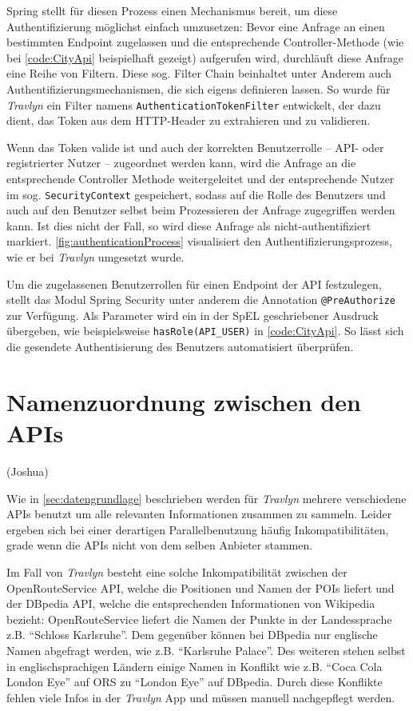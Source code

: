 		Spring stellt für diesen Prozess einen Mechanismus bereit, um diese Authentifizierung möglichst einfach umzusetzen: Bevor eine Anfrage an einen bestimmten Endpoint zugelassen und die entsprechende Controller-Methode (wie bei \autoref{code:CityApi} beispielhaft gezeigt) aufgerufen wird, durchläuft diese Anfrage eine Reihe von Filtern. Diese sog. Filter Chain beinhaltet unter Anderem auch Authentifizierungsmechanismen, die sich eigens definieren lassen. So wurde für \textit{Travlyn} ein Filter namens \lstinline|AuthenticationTokenFilter| entwickelt, der dazu dient, das Token aus dem \acs{HTTP}-Header zu extrahieren und zu validieren. 
		
		Wenn das Token valide ist und auch der korrekten Benutzerrolle -- \acs{API}- oder registrierter Nutzer -- zugeordnet werden kann, wird die Anfrage an die entsprechende Controller Methode weitergeleitet und der entsprechende Nutzer im sog. \lstinline|SecurityContext| gespeichert, sodass auf die Rolle des Benutzers und auch auf den Benutzer selbst beim Prozessieren der Anfrage zugegriffen werden kann. Ist dies nicht der Fall, so wird diese Anfrage als nicht-authentifiziert markiert. \autoref{fig:authenticationProcess} visualisiert den Authentifizierungsprozess, wie er bei \textit{Travlyn} umgesetzt wurde.
		
		Um die zugelassenen Benutzerrollen für einen Endpoint der \acs{API} festzulegen, stellt das Modul Spring Security unter anderem die Annotation \lstinline|@PreAuthorize| zur Verfügung. Als Parameter wird ein in der \ac{SpEL} geschriebener Ausdruck übergeben, wie beispielsweise \lstinline|hasRole(API_USER)| in \autoref{code:CityApi}. So lässt sich die gesendete Authentisierung des Benutzers automatisiert überprüfen.
		
	\section{Namenzuordnung zwischen den \acs{API}s}
	
	(Joshua)
	
	Wie in \autoref{sec:datengrundlage} beschrieben werden für \textit{Travlyn} mehrere verschiedene \acs{API}s benutzt um alle relevanten Informationen zusammen zu sammeln. Leider ergeben sich bei einer derartigen Parallelbenutzung häufig Inkompatibilitäten, grade wenn die \acs{API}s nicht von dem selben Anbieter stammen.
	
	\vspace{0.25cm}
	
	Im Fall von \textit{Travlyn} besteht eine solche Inkompatibilität zwischen der OpenRouteService \acs{API}, welche die Positionen und Namen der \acs{POI}s liefert und der DBpedia \acs{API}, welche die entsprechenden Informationen von Wikipedia bezieht: OpenRouteService liefert die Namen der Punkte in der Landessprache z.B. \enquote{Schloss Karlsruhe}. Dem gegenüber können bei DBpedia nur englische Namen abgefragt werden, wie z.B. \enquote{Karlsruhe Palace}. Des weiteren stehen selbst in englischsprachigen Ländern einige Namen in Konflikt wie z.B. \enquote{Coca Cola London Eye} auf \acs{ORS} zu \enquote{London Eye} auf DBpedia. Durch diese Konflikte fehlen viele Infos in der \textit{Travlyn} App und müssen manuell nachgepflegt werden.
	
